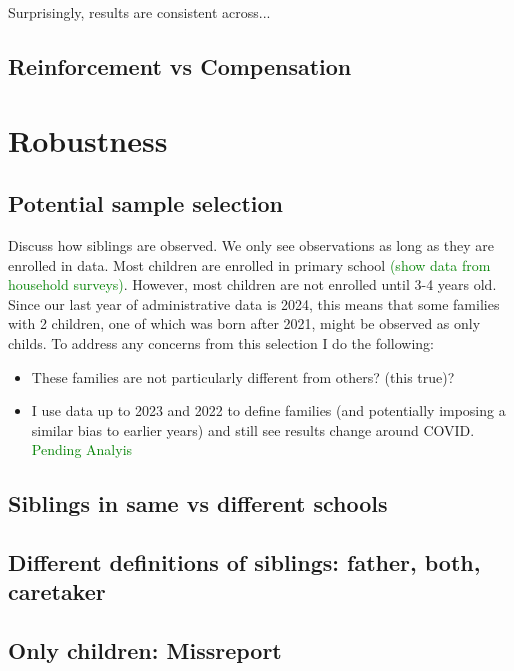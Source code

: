 Surprisingly, results are consistent across...

\subsection{Reinforcement vs Compensation}

\section{Robustness}\label{sec:robustness}

\subsection{Potential sample selection}

Discuss how siblings are observed. We only see observations as long as they are enrolled in data. Most children are enrolled in primary school \textcolor{green}{(show data from household surveys)}. However, most children are not enrolled until 3-4 years old. Since our last year of administrative data is 2024, this means that some families with 2 children, one of which was born after 2021, might be observed as only childs. To address any concerns from this selection I do the following:

\begin{itemize}
    \item These families are not particularly different from others? (this true)?
    \item I use data up to 2023 and 2022 to define families (and potentially imposing a similar bias to earlier years) and still see results change around COVID. \textcolor{green}{Pending Analyis}
\end{itemize}


\subsection{Siblings in same vs different schools}

\subsection{Different definitions of siblings: father, both, caretaker}

\subsection{Only children: Missreport}

